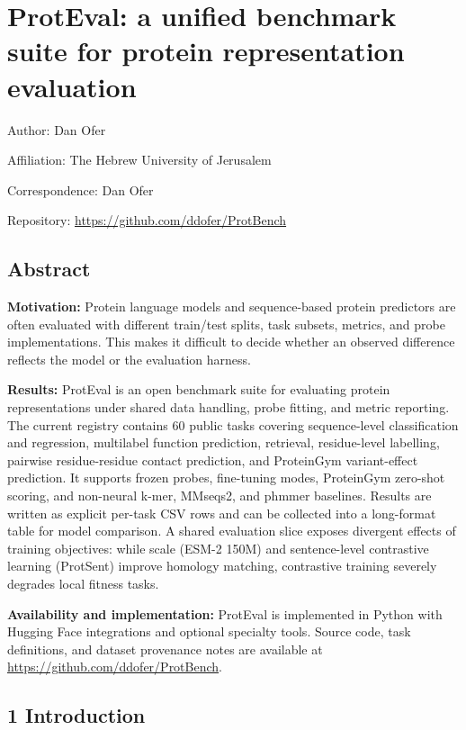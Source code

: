 \documentclass[
]{article}
\author{}
\date{}
\begin{document}
\section{ProtEval: a unified benchmark suite for protein representation
evaluation}\label{proteval-a-unified-benchmark-suite-for-protein-representation-evaluation}

Author: Dan Ofer

Affiliation: The Hebrew University of Jerusalem

Correspondence: Dan Ofer

Repository: \url{https://github.com/ddofer/ProtBench}

\subsection{Abstract}\label{abstract}

\textbf{Motivation:} Protein language models and sequence-based protein
predictors are often evaluated with different train/test splits, task
subsets, metrics, and probe implementations. This makes it difficult to
decide whether an observed difference reflects the model or the
evaluation harness.

\textbf{Results:} ProtEval is an open benchmark suite for evaluating
protein representations under shared data handling, probe fitting, and
metric reporting. The current registry contains 60 public tasks covering
sequence-level classification and regression, multilabel function
prediction, retrieval, residue-level labelling, pairwise
residue-residue contact prediction, and ProteinGym variant-effect
prediction. It supports frozen probes, fine-tuning modes,
ProteinGym zero-shot scoring, and non-neural k-mer, MMseqs2, and phmmer
baselines. Results are written as explicit per-task CSV rows and can be
collected into a long-format table for model comparison. A shared
evaluation slice exposes divergent effects of training objectives: while
scale (ESM-2 150M) and sentence-level contrastive learning (ProtSent)
improve homology matching, contrastive training severely degrades local
fitness tasks.

\textbf{Availability and implementation:} ProtEval is implemented in
Python with Hugging Face integrations and optional specialty tools.
Source code, task definitions, and dataset provenance notes are
available at \url{https://github.com/ddofer/ProtBench}.

\subsection{1 Introduction}\label{introduction}
\end{document}
